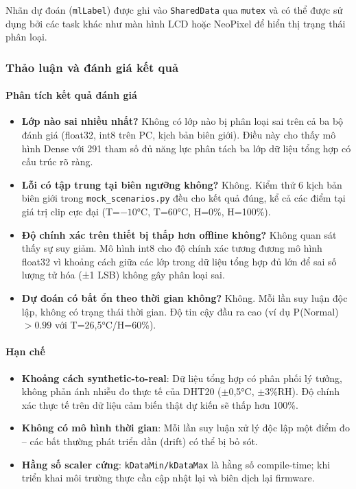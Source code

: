 Nhãn dự đoán (\texttt{mlLabel}) được ghi vào \texttt{SharedData} qua \texttt{mutex} và có thể được sử dụng bởi các task khác như màn hình LCD hoặc NeoPixel để hiển thị trạng thái phân loại.

\subsubsection*{Thảo luận và đánh giá kết quả}

\paragraph{Phân tích kết quả đánh giá}

\begin{itemize}
    \item \textbf{Lớp nào sai nhiều nhất?} Không có lớp nào bị phân loại sai trên cả ba bộ đánh giá (float32, int8 trên PC, kịch bản biên giới). Điều này cho thấy mô hình Dense với 291 tham số đủ năng lực phân tách ba lớp dữ liệu tổng hợp có cấu trúc rõ ràng.

    \item \textbf{Lỗi có tập trung tại biên ngưỡng không?} Không. Kiểm thử 6 kịch bản biên giới trong \texttt{mock\_scenarios.py} đều cho kết quả đúng, kể cả các điểm tại giá trị clip cực đại (T=$-10$°C, T=60°C, H=0\%, H=100\%).

    \item \textbf{Độ chính xác trên thiết bị thấp hơn offline không?} Không quan sát thấy sự suy giảm. Mô hình int8 cho độ chính xác tương đương mô hình float32 vì khoảng cách giữa các lớp trong dữ liệu tổng hợp đủ lớn để sai số lượng tử hóa (±1 LSB) không gây phân loại sai.

    \item \textbf{Dự đoán có bất ổn theo thời gian không?} Không. Mỗi lần suy luận độc lập, không có trạng thái thời gian. Độ tin cậy đầu ra cao (ví dụ P(Normal) $> 0.99$ với T=26,5°C/H=60\%).
\end{itemize}

\paragraph{Hạn chế}

\begin{itemize}
    \item \textbf{Khoảng cách synthetic-to-real}: Dữ liệu tổng hợp có phân phối lý tưởng, không phản ánh nhiễu đo thực tế của DHT20 ($\pm$0,5°C, $\pm$3\%RH). Độ chính xác thực tế trên dữ liệu cảm biến thật dự kiến sẽ thấp hơn 100\%.
    \item \textbf{Không có mô hình thời gian}: Mỗi lần suy luận xử lý độc lập một điểm đo -- các bất thường phát triển dần (drift) có thể bị bỏ sót.
    \item \textbf{Hằng số scaler cứng}: \texttt{kDataMin/kDataMax} là hằng số compile-time; khi triển khai môi trường thực cần cập nhật lại và biên dịch lại firmware.
\end{itemize}

